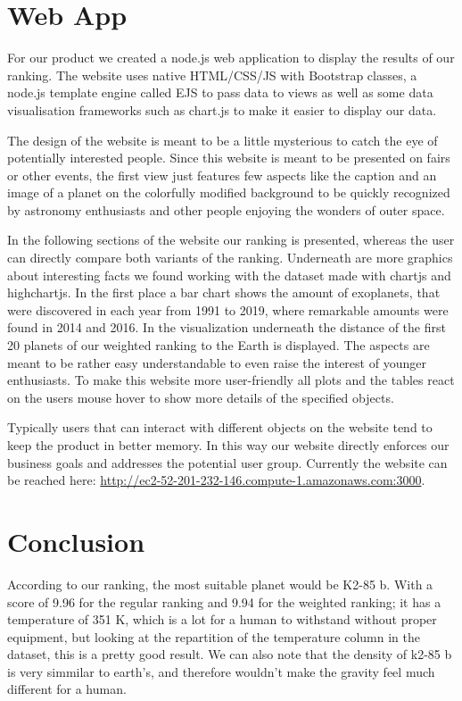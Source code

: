 \documentclass[12p]{article}
\begin{document}

\section{Web App}
For our product we created a node.js web application to display the results of our ranking. The website uses native HTML/CSS/JS with Bootstrap classes, a node.js template engine called EJS to pass data to views as well as some data visualisation frameworks such as chart.js to make it easier to display our data.

The design of the website is meant to be a little mysterious to catch the eye of potentially interested people. Since this website is meant to be presented on fairs or other events, the first view just features few aspects like the caption and an image of a planet on the colorfully modified background to be quickly recognized by astronomy enthusiasts and other people enjoying the wonders of outer space.

In the following sections of the website our ranking is presented, whereas the user can directly compare both variants of the ranking. Underneath are more graphics about interesting facts we found working with the dataset made with chartjs and highchartjs. In the first place a bar chart shows the amount of exoplanets, that were discovered in each year from 1991 to 2019, where remarkable amounts were found in 2014 and 2016. In the visualization underneath the distance of the first 20 planets of our weighted ranking to the Earth is displayed. The aspects are meant to be rather easy understandable to even raise the interest of younger enthusiasts.
To make this website more user-friendly all plots and the tables react on the users mouse hover to show more details of the specified objects.

Typically users that can interact with different objects on the website tend to keep the product in better memory. In this way our website directly enforces our business goals and addresses the potential user group.
Currently the website can be reached here: \url{http://ec2-52-201-232-146.compute-1.amazonaws.com:3000}.


\section{Conclusion}
According to our ranking, the most suitable planet would be K2-85 b. With a score of 9.96 for the regular ranking and 9.94 for the weighted ranking; it has a temperature of 351 K, which is a lot for a human to withstand without proper equipment, but looking at the repartition of the temperature column in the dataset, this is a pretty good result. We can also note that the density of k2-85 b is very simmilar to earth's, and therefore wouldn't make the gravity feel much different for a human.
\end{document}
